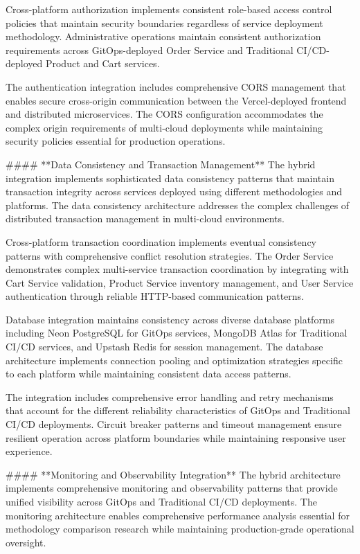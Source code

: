 Cross-platform authorization implements consistent role-based access control policies that maintain security boundaries regardless of service deployment methodology. Administrative operations maintain consistent authorization requirements across GitOps-deployed Order Service and Traditional CI/CD-deployed Product and Cart services.

The authentication integration includes comprehensive CORS management that enables secure cross-origin communication between the Vercel-deployed frontend and distributed microservices. The CORS configuration accommodates the complex origin requirements of multi-cloud deployments while maintaining security policies essential for production operations.

#### **Data Consistency and Transaction Management**
The hybrid integration implements sophisticated data consistency patterns that maintain transaction integrity across services deployed using different methodologies and platforms. The data consistency architecture addresses the complex challenges of distributed transaction management in multi-cloud environments.

Cross-platform transaction coordination implements eventual consistency patterns with comprehensive conflict resolution strategies. The Order Service demonstrates complex multi-service transaction coordination by integrating with Cart Service validation, Product Service inventory management, and User Service authentication through reliable HTTP-based communication patterns.

Database integration maintains consistency across diverse database platforms including Neon PostgreSQL for GitOps services, MongoDB Atlas for Traditional CI/CD services, and Upstash Redis for session management. The database architecture implements connection pooling and optimization strategies specific to each platform while maintaining consistent data access patterns.

The integration includes comprehensive error handling and retry mechanisms that account for the different reliability characteristics of GitOps and Traditional CI/CD deployments. Circuit breaker patterns and timeout management ensure resilient operation across platform boundaries while maintaining responsive user experience.

#### **Monitoring and Observability Integration**
The hybrid architecture implements comprehensive monitoring and observability patterns that provide unified visibility across GitOps and Traditional CI/CD deployments. The monitoring architecture enables comprehensive performance analysis essential for methodology comparison research while maintaining production-grade operational oversight.

